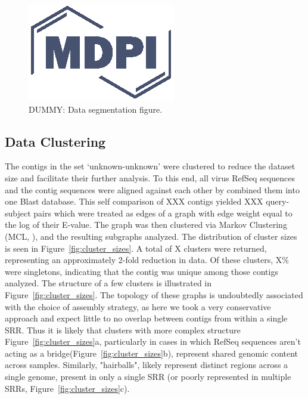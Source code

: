 \documentclass[genes, moreauthors]{Definitions/mdpi}
\begin{document}
  \begin{figure}[h]
    \centering
    \includegraphics{Definitions/logo-mdpi}
    \caption{DUMMY: Data segmentation figure.
            \label{fig:data_segmentation}}
  \end{figure}

  \subsection{Data Clustering}
  The contigs in the set ‘unknown-unknown’ were clustered to reduce the dataset
  size and facilitate their  further analysis. To this end, all virus RefSeq
  sequences and the contig sequences were aligned against each other by
  combined them  into one Blast database. This self comparison of XXX contigs
  yielded XXX query-subject pairs which were treated as edges of a graph with
  edge weight equal to the log of their E-value. The graph was then clustered
  via Markov Clustering (MCL, \cite{Enright2002}), and the resulting subgraphs
  analyzed. The distribution of cluster sizes is seen in
  Figure~\ref{fig:cluster_sizes}. A total of X clusters were returned,
  representing an approximately 2-fold reduction in data. Of these clusters,
  X\% were singletons, indicating that the contig was unique among those
  contigs analyzed. The structure of a few clusters is illustrated in
  Figure~\ref{fig:cluster_sizes}. The topology of these graphs is undoubtedly
  associated with the choice of assembly strategy, as here we took a very
  conservative approach and expect little to no overlap between contigs from
  within a single SRR. Thus it is likely that clusters with more complex
  structure Figure~\ref{fig:cluster_sizes}a, particularly in cases in which
  RefSeq sequences aren't acting as a bridge(Figure~\ref{fig:cluster_sizes}b),
  represent shared genomic content across samples. Similarly, "hairballs",
  likely represent distinct regions across a single genome, present in only a
  single SRR (or poorly represented in multiple SRRs,
  Figure~\ref{fig:cluster_sizes}c).
\end{document}
